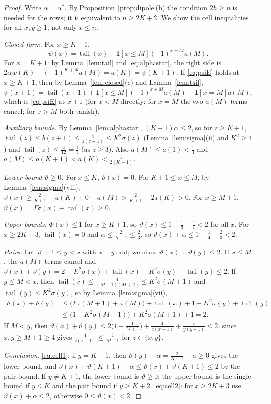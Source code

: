 \documentclass[11pt]{amsart}
\theoremstyle{definition}
\theoremstyle{remark}
\numberwithin{equation}{section}
\newcommand{\tail}{\operatorname{tail}}
\newcommand{\ind}[1]{\mathbf{1}[#1]}
\begin{document}
\begin{proof}
Write $\alpha=\alpha^*$. By Proposition~\ref{prop:dipole}(b) the condition $2h\ge n$ is needed for the
rows; it is equivalent to $n\ge2K+2$. We show the cell inequalities for all $x,y\ge1$, not only
$x\le n$.

\emph{Closed form.} For $x\ge K+1$,
\begin{equation}\label{eq:psiE}
  \psi(x)=\tail(x)-\ind{x\le M}(-1)^{x+M}a(M).
\end{equation}
For $x=K+1$: by Lemma~\ref{lem:tail} and \eqref{eq:alphastar}, the right side is
$2\alpha w(K)+(-1)^{K+M}a(M)=a(K)=\psi(K+1)$. If \eqref{eq:psiE} holds at $x\ge K+1$, then by
Lemma~\ref{lem:closed}(c) and Lemma~\ref{lem:tail},
$\psi(x+1)=\tail(x+1)+\ind{x\le M}(-1)^{x+M}a(M)-\ind{x=M}a(M)$, which is \eqref{eq:psiE} at $x+1$ (for
$x<M$ directly; for $x=M$ the two $a(M)$ terms cancel; for $x>M$ both vanish).

\emph{Auxiliary bounds.} By Lemma~\ref{lem:alphastar}, $(K+1)\alpha\le2$, so for $z\ge K+1$,
$\tail(z)\le b(z+1)\le\frac4{z(z+1)}\le K^2\sigma(z)$ (Lemma~\ref{lem:sigma}(ii) and $K^2\ge4$) and
$\tail(z)\le\frac4{12}=\frac13$ (as $z\ge3$). Also $a(M)\le a(1)<\frac14$ and $a(M)\le a(K+1)<a(K)<\frac1{2(K+1)}$.

\emph{Lower bound $\vartheta\ge0$.} For $x\le K$, $\vartheta(x)=0$. For $K+1\le x\le M$, by
Lemma~\ref{lem:sigma}(viii), $\vartheta(x)\ge\frac2{K+1}-a(K)+0-a(M)>\frac2{K+1}-2a(K)>0$. For $x\ge M+1$,
$\vartheta(x)=\Gamma\sigma(x)+\tail(x)\ge0$.

\emph{Upper bounds.} $\Phi(x)\le1$ for $x\ge K+1$, so $\vartheta(x)\le1+\frac13+\frac14<2$ for all $x$. For
$x\ge2K+3$, $\tail(x)=0$ and $\alpha\le\frac2{K+1}\le\frac23$, so $\vartheta(x)+\alpha\le1+\frac14+\frac23<2$.

\emph{Pairs.} Let $K+1\le y<x$ with $x-y$ odd; we show $\vartheta(x)+\vartheta(y)\le2$. If $x\le M$, the
$a(M)$ terms cancel and $\vartheta(x)+\vartheta(y)=2-K^2\sigma(x)+\tail(x)-K^2\sigma(y)+\tail(y)\le2$. If
$y\le M<x$, then $\tail(x)\le\frac4{(M+1)(M+2)}\le K^2\sigma(M+1)$ and $\tail(y)\le K^2\sigma(y)$, so by
Lemma~\ref{lem:sigma}(vii),
\begin{align*}
  \vartheta(x)+\vartheta(y)&\le\bigl(\Gamma\sigma(M+1)+a(M)\bigr)+\tail(x)+1-K^2\sigma(y)+\tail(y)\\
  &\le\bigl(1-K^2\sigma(M+1)\bigr)+K^2\sigma(M+1)+1=2 .
\end{align*}
If $M<y$, then $\vartheta(x)+\vartheta(y)\le2\bigl(1-\frac1{M+1}\bigr)+\frac4{x(x+1)}+\frac4{y(y+1)}\le2$,
since $x,y\ge M+1\ge4$ gives $\frac4{z(z+1)}\le\frac1{M+1}$ for $z\in\{x,y\}$.

\emph{Conclusion.} \eqref{eq:cell1}: if $y=K+1$, then $\vartheta(y)-\alpha=\frac2{K+1}-\alpha\ge0$ gives the
lower bound, and $\vartheta(x)+\vartheta(K+1)-\alpha\le\vartheta(x)+\vartheta(K+1)\le2$ by the pair bound.
If $y\ne K+1$, the lower bound is $\vartheta\ge0$; the upper bound is the single bound if $y\le K$ and
the pair bound if $y\ge K+2$. \eqref{eq:cell2}: for $x\ge2K+3$ use $\vartheta(x)+\alpha\le2$, otherwise
$0\le\vartheta(x)<2$.
\end{proof}
\end{document}
